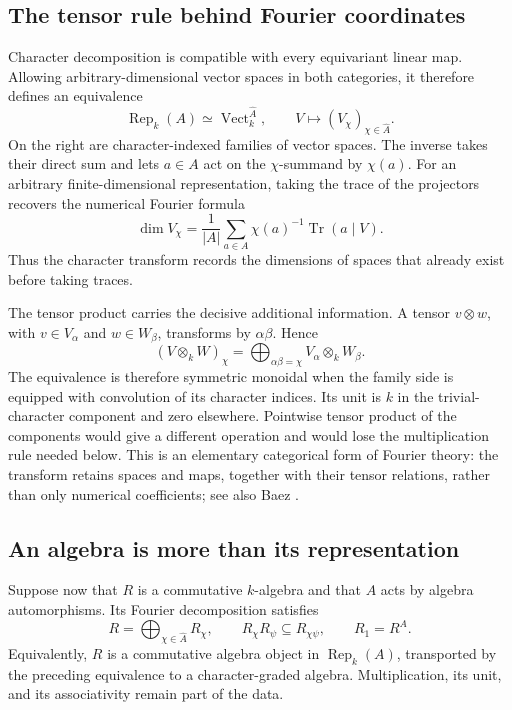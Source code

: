 \documentclass[11pt]{article}
\theoremstyle{remark}
\begin{document}
\subsection{The tensor rule behind Fourier coordinates}

Character decomposition is compatible with every equivariant linear map. Allowing arbitrary-dimensional vector spaces in both categories, it therefore defines an equivalence
\[
\operatorname{Rep}_k(A)\simeq\operatorname{Vect}_k^{\widehat A},
\qquad
V\longmapsto(V_\chi)_{\chi\in\widehat A}.
\]
On the right are character-indexed families of vector spaces. The inverse takes their direct sum and lets \(a\in A\) act on the \(\chi\)-summand by \(\chi(a)\). For an arbitrary finite-dimensional representation, taking the trace of the projectors recovers the numerical Fourier formula
\[
\dim V_\chi
=\frac1{|A|}\sum_{a\in A}\chi(a)^{-1}\operatorname{Tr}(a\mid V).
\]
Thus the character transform records the dimensions of spaces that already exist before taking traces.

The tensor product carries the decisive additional information. A tensor \(v\otimes w\), with \(v\in V_\alpha\) and \(w\in W_\beta\), transforms by \(\alpha\beta\). Hence
\[
(V\otimes_k W)_\chi
=\bigoplus_{\alpha\beta=\chi}V_\alpha\otimes_k W_\beta.
\]
The equivalence is therefore symmetric monoidal when the family side is equipped with convolution of its character indices. Its unit is \(k\) in the trivial-character component and zero elsewhere. Pointwise tensor product of the components would give a different operation and would lose the multiplication rule needed below. This is an elementary categorical form of Fourier theory: the transform retains spaces and maps, together with their tensor relations, rather than only numerical coefficients; see also Baez \cite{baez}.

\subsection{An algebra is more than its representation}

Suppose now that \(R\) is a commutative \(k\)-algebra and that \(A\) acts by algebra automorphisms. Its Fourier decomposition satisfies
\[
R=\bigoplus_{\chi\in\widehat A}R_\chi,
\qquad
R_\chi R_\psi\subseteq R_{\chi\psi},
\qquad
R_1=R^A.
\]
Equivalently, \(R\) is a commutative algebra object in \(\operatorname{Rep}_k(A)\), transported by the preceding equivalence to a character-graded algebra. Multiplication, its unit, and its associativity remain part of the data.
\end{document}
